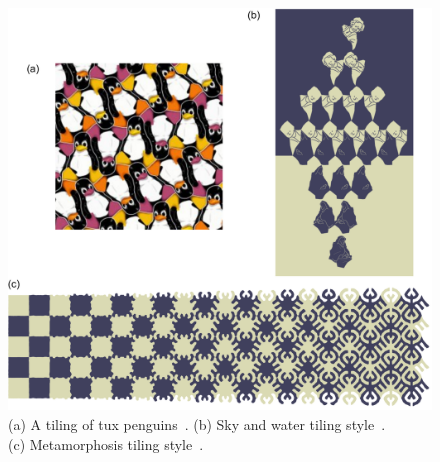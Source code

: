 \begin{figure}
\centering
\includegraphics[width=1.0\textwidth]{figures/related/tilings.pdf} 
\caption[Tilings]
{\label{fig_related_escherization} 
\nnewtext
{
(a) A tiling of tux penguins~\cite{Kaplan2000}.
(b) Sky and water tiling style~\cite{Kaplan2004}. \\
(c) Metamorphosis tiling style~\cite{Kaplan2010}.
}
}
\end{figure}








